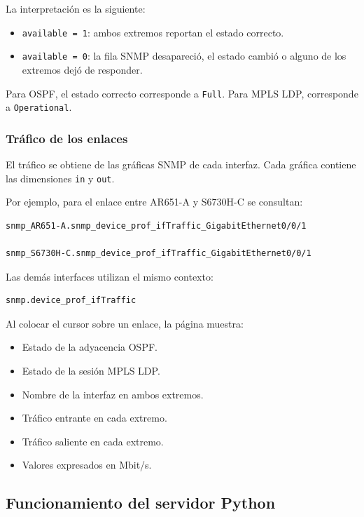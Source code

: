 La interpretación es la siguiente:

\begin{itemize}
    \item \texttt{available = 1}: ambos extremos reportan el estado correcto.
    \item \texttt{available = 0}: la fila SNMP desapareció, el estado cambió o
    alguno de los extremos dejó de responder.
\end{itemize}

Para OSPF, el estado correcto corresponde a \texttt{Full}. Para MPLS LDP,
corresponde a \texttt{Operational}.

\subsubsection{Tráfico de los enlaces}

El tráfico se obtiene de las gráficas SNMP de cada interfaz. Cada gráfica
contiene las dimensiones \texttt{in} y \texttt{out}.

Por ejemplo, para el enlace entre AR651-A y S6730H-C se consultan:

\begin{lstlisting}[style=terminal]
snmp_AR651-A.snmp_device_prof_ifTraffic_GigabitEthernet0/0/1

snmp_S6730H-C.snmp_device_prof_ifTraffic_GigabitEthernet0/0/1
\end{lstlisting}

Las demás interfaces utilizan el mismo contexto:

\begin{lstlisting}[style=terminal]
snmp.device_prof_ifTraffic
\end{lstlisting}

Al colocar el cursor sobre un enlace, la página muestra:

\begin{itemize}
    \item Estado de la adyacencia OSPF.
    \item Estado de la sesión MPLS LDP.
    \item Nombre de la interfaz en ambos extremos.
    \item Tráfico entrante en cada extremo.
    \item Tráfico saliente en cada extremo.
    \item Valores expresados en Mbit/s.
\end{itemize}

\subsection{Funcionamiento del servidor Python}

